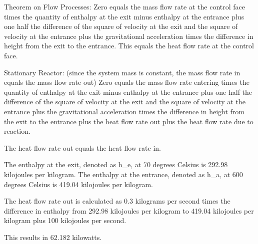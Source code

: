 Theorem on Flow Processes:
Zero equals the mass flow rate at the control face times the quantity of enthalpy at the exit minus enthalpy at the entrance plus one half the difference of the square of velocity at the exit and the square of velocity at the entrance plus the gravitational acceleration times the difference in height from the exit to the entrance. This equals the heat flow rate at the control face.

Stationary Reactor: (since the system mass is constant, the mass flow rate in equals the mass flow rate out)
Zero equals the mass flow rate entering times the quantity of enthalpy at the exit minus enthalpy at the entrance plus one half the difference of the square of velocity at the exit and the square of velocity at the entrance plus the gravitational acceleration times the difference in height from the exit to the entrance plus the heat flow rate out plus the heat flow rate due to reaction.

The heat flow rate out equals the heat flow rate in.

The enthalpy at the exit, denoted as h_e, at 70 degrees Celsius is 292.98 kilojoules per kilogram.
The enthalpy at the entrance, denoted as h_a, at 600 degrees Celsius is 419.04 kilojoules per kilogram.

The heat flow rate out is calculated as 0.3 kilograms per second times the difference in enthalpy from 292.98 kilojoules per kilogram to 419.04 kilojoules per kilogram plus 100 kilojoules per second.

This results in 62.182 kilowatts.